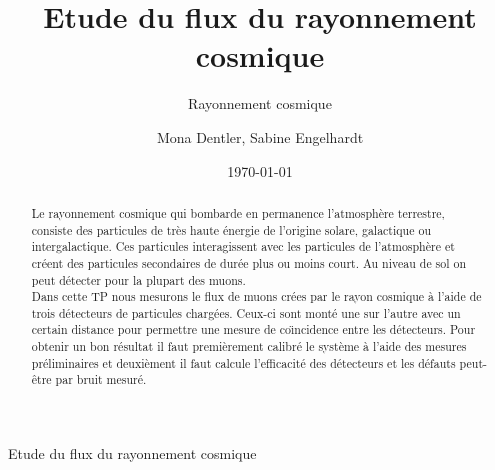 \documentclass[a4paper,11pt,liststotocnumbered,bibtotocnumbered]{scrartcl}
\title{Etude du flux du rayonnement cosmique}
\subtitle{Rayonnement cosmique}
\author{Mona Dentler, Sabine Engelhardt}
\date{\today}
\begin{document}
 \nocite{poly}
 \pagestyle{empty}
 \begin{center}
  \makeatletter
  \@subject
  \vspace{2cm}

  \Huge
  Etude du flux du rayonnement cosmique\newline
  \vspace{1cm}
  \Large


  \@author
  \newline
  \@publishers


  \@date
  \makeatother
 \end{center}
 \vfill

 \begin{abstract}
  Le rayonnement cosmique qui bombarde en permanence l'atmosphère terrestre, consiste des particules de très haute énergie de l'origine solare, galactique ou intergalactique. Ces particules interagissent avec les particules de l'atmosphère et créent des particules secondaires de durée plus ou moins court. Au niveau de sol on peut détecter pour la plupart des muons.\\
  Dans cette TP nous mesurons le flux de muons crées par le rayon cosmique à l'aide de trois détecteurs de particules chargées. Ceux-ci sont monté une sur l'autre avec un certain distance pour permettre une mesure de co\"{\i}ncidence entre les détecteurs. Pour obtenir un bon résultat il faut premièrement calibré le système à l'aide des mesures préliminaires et deuxièment il faut calcule l'efficacité des détecteurs et les défauts peut-être par bruit mesuré.
 \end{abstract}
\newpage
 \pagestyle{scrheadings}
 \tableofcontents
\newpage
\end{document}
